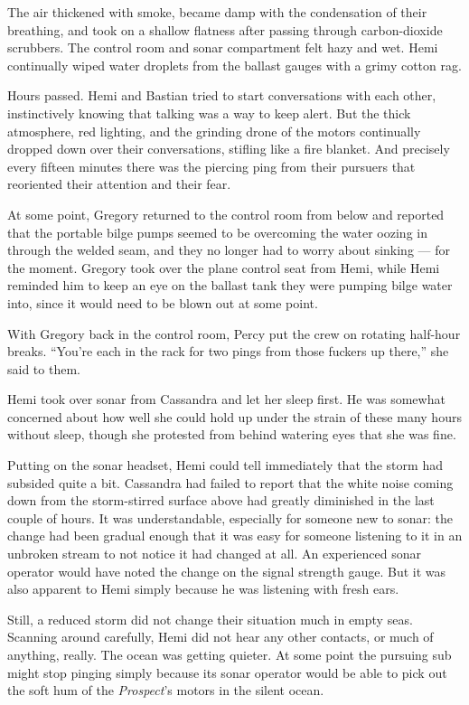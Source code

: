 \documentclass[
]{scrbook}
\begin{document}
The air thickened with smoke, became damp with the condensation of their
breathing, and took on a shallow flatness after passing through
carbon-dioxide scrubbers. The control room and sonar compartment felt
hazy and wet. Hemi continually wiped water droplets from the ballast
gauges with a grimy cotton rag.

Hours passed. Hemi and Bastian tried to start conversations with each
other, instinctively knowing that talking was a way to keep alert. But
the thick atmosphere, red lighting, and the grinding drone of the motors
continually dropped down over their conversations, stifling like a fire
blanket. And precisely every fifteen minutes there was the piercing ping
from their pursuers that reoriented their attention and their fear.

At some point, Gregory returned to the control room from below and
reported that the portable bilge pumps seemed to be overcoming the water
oozing in through the welded seam, and they no longer had to worry about
sinking --- for the moment. Gregory took over the plane control seat
from Hemi, while Hemi reminded him to keep an eye on the ballast tank
they were pumping bilge water into, since it would need to be blown out
at some point.

With Gregory back in the control room, Percy put the crew on rotating
half-hour breaks. ``You're each in the rack for two pings from those
fuckers up there,'' she said to them.

Hemi took over sonar from Cassandra and let her sleep first. He was
somewhat concerned about how well she could hold up under the strain of
these many hours without sleep, though she protested from behind
watering eyes that she was fine.

Putting on the sonar headset, Hemi could tell immediately that the storm
had subsided quite a bit. Cassandra had failed to report that the white
noise coming down from the storm-stirred surface above had greatly
diminished in the last couple of hours. It was understandable,
especially for someone new to sonar: the change had been gradual enough
that it was easy for someone listening to it in an unbroken stream to
not notice it had changed at all. An experienced sonar operator would
have noted the change on the signal strength gauge. But it was also
apparent to Hemi simply because he was listening with fresh ears.

Still, a reduced storm did not change their situation much in empty
seas. Scanning around carefully, Hemi did not hear any other contacts,
or much of anything, really. The ocean was getting quieter. At some
point the pursuing sub might stop pinging simply because its sonar
operator would be able to pick out the soft hum of the \emph{Prospect}'s
motors in the silent ocean.
\end{document}
